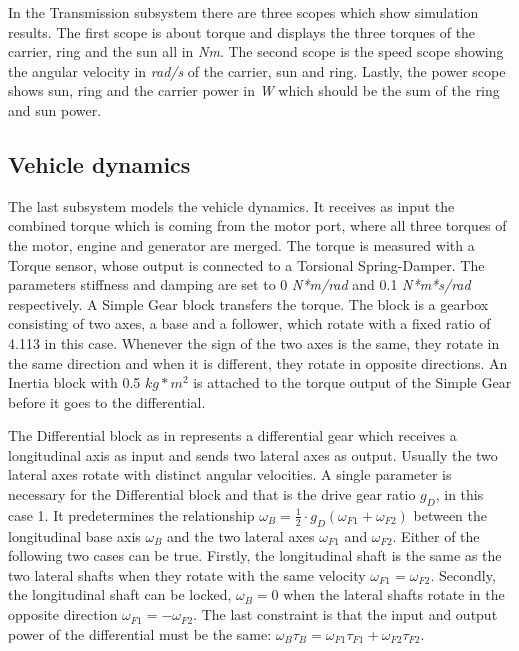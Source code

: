 In the Transmission subsystem there are three scopes which show simulation results. The first scope is about torque and displays the three torques of the carrier, ring and the sun all in \textit{Nm}. The second scope is the speed scope showing the angular velocity in \textit{rad/s} of the carrier, sun and ring. Lastly, the power scope shows sun, ring and the carrier power in \textit{W} which should be the sum of the ring and sun power.

\subsection{Vehicle dynamics}
The last subsystem models the vehicle dynamics. It receives as input the combined torque which is coming from the motor port, where all three torques of the motor, engine and generator are merged. The torque is measured with a Torque sensor, whose output is connected to a Torsional Spring-Damper. The parameters stiffness and damping are set to 0 \textit{N*m/rad} and 0.1 \textit{N*m*s/rad} respectively. A Simple Gear block \citep{simpleGearMatlab} transfers the torque. The block is a gearbox consisting of two axes, a base and a follower, which rotate with a fixed ratio of 4.113 in this case. Whenever the sign of the two axes is the same, they rotate in the same direction and when it is different, they rotate in opposite directions. An Inertia block with 0.5 $kg*m^2$ is attached to the torque output of the Simple Gear before it goes to the differential. 

The Differential block as in \citet{differentialMatlab} represents a differential gear which receives a longitudinal axis as input and sends two lateral axes as output. Usually the two lateral axes rotate with distinct angular velocities. A single parameter is necessary for the Differential block and that is the  drive gear ratio $g_D$, in this case 1. It predetermines the relationship $\omega_B = \frac{1}{2} \cdot g_D(\omega_{F1} + \omega_{F2})$ between the longitudinal base axis $\omega_B$ and the two lateral axes $\omega_{F1}$ and $\omega_{F2}$. Either of the following two cases can be true. Firstly, the longitudinal shaft is the same as the two lateral shafts when they rotate with the same velocity $\omega_{F1} = \omega_{F2}$. Secondly, the longitudinal shaft can be locked, $\omega_B = 0$ when the lateral shafts rotate in the opposite direction $\omega_{F1} = -\omega_{F2}$. The last constraint is that the input and output power of the differential must be the same: $\omega_B \tau_B = \omega_{F1} \tau_{F1} + \omega_{F2} \tau_{F2}$.

